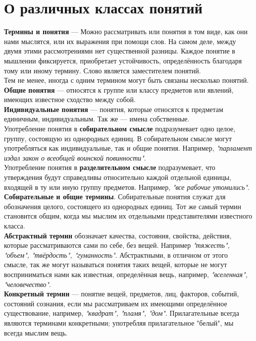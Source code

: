 \documentclass{article}
\begin{document}
\section{О различных классах понятий}
\textbf{Термины и понятия} --- Можно рассматривать или понятия в том виде, как они нами мыслятся, или их выражения при помощи слов. На самом деле, между двумя этими рассмотрениями нет существенной разницы. Каждое понятие в мышлении фиксируется, приобретает устойчивость, определённость благодаря тому или иному термину. Слово является заместителем понятий.
\\
Тем не менее, иногда с одним термином могут быть связаны несколько понятий.
\\
\textbf{Общие понятия} --- относятся к группе или классу предметов или явлений, имеющих известное сходство между собой.
\\
\textbf{Индивидуальные понятия} --- понятия, которые относятся к предметам единичным, индивидуальным. Так же --- имена собственные.
\\
Употребление понятия в \textbf{собирательном смысле} подразумевает одно целое, группу, состоящую из однородных единиц. В собирательном смысле могут употребляться как индивидуальные, так и общие понятия. Например, \textit{"парламент издал закон о всеобщей воинской повинности"}.
\\
Употребление понятия в \textbf{разделительном смысле} подразумевает, что утверждения будут справедливы относительно каждой отдельной единицы, входящей в ту или иную группу предметов. Например, \textit{"все рабочие утомились"}.
\\
\textbf{Собирательные и общие термины}. Собирательные понятия служат для обозначения целого, состоящего из однородных единиц. Тот же самый термин становится общим, когда мы мыслим их отдельными представителями известного класса.
\\
\textbf{Абстрактный термин} обозначает качества, состояния, свойства, действия, которые рассматриваются сами по себе, без вещей. Например \textit{"тяжесть", "объем", "твёрдость", "гуманность"}. Абстрактными, в отличном от этого смысле, так же могут называться понятия таких вещей, которые не могут восприниматься нами как известная, определённая вещь, например, \textit{"вселенная", "человечество"}.
\\
\textbf{Конкретный термин} --- понятие вещей, предметов, лиц, факторов, событий, состояний сознания, если мы рассматриваем их имеющими определённое существование, например, \textit{"квадрат", "пламя", "дом"}. Прилагательные всегда являются терминами конкретными; употребляя прилагательное "белый", мы всегда мыслим вещь.
\end{document}
